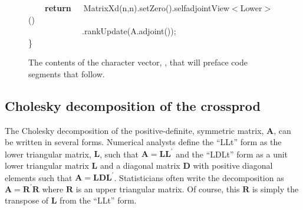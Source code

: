 \documentclass[shortnames,article]{jss}
\newcommand{\hlstd}[1]{\textcolor[rgb]{0,0,0}{#1}}
\newcommand{\hlopt}[1]{\textcolor[rgb]{0,0,0}{#1}}
\newcommand{\hlkwa}[1]{\textcolor[rgb]{0.61,0.13,0.93}{\bf{#1}}}
\newcommand{\hlkwd}[1]{\textcolor[rgb]{0,0,0}{#1}}
\begin{document}
\begin{figure}[htb]
  \hlstd{}\hlstd{\ \ \ \ }\hlstd{}\hlkwa{return}\hlstd{\ \ \ }\hlkwa{}\hlstd{}\hlkwd{MatrixXd}\hlstd{}\hlopt{(}\hlstd{n}\hlopt{,}\hlstd{n}\hlopt{).}\hlstd{}\hlkwd{setZero}\hlstd{}\hlopt{().}\hlstd{selfadjointView}\hlopt{$<$}\hlstd{Lower}\hlopt{$>$()}\hspace*{\fill}\\
  \hlstd{}\hlstd{\ \ \ \ \ \ \ \ \ \ \ \ \ }\hlstd{}\hlopt{.}\hlstd{}\hlkwd{rankUpdate}\hlstd{}\hlopt{(}\hlstd{A}\hlopt{.}\hlstd{}\hlkwd{adjoint}\hlstd{}\hlopt{());}\hspace*{\fill}\\
  \hlstd{}\hlopt{\}}\hlstd{}\hspace*{\fill}\\
  \mbox{}
  \normalfont
  \normalsize
  \caption{The contents of the character vector, , that will preface  code segments that follow.}
  \label{fig:incl}
\end{figure}

\subsection{Cholesky decomposition of the crossprod}
\label{sec:chol}

The Cholesky decomposition of the positive-definite, symmetric matrix,
$\bm A$, can be written in several forms.  Numerical analysts define
the ``LLt'' form as the lower triangular matrix, $\bm L$, such that
$\bm A=\bm L\bm L^\prime$ and the ``LDLt'' form as a unit lower
triangular matrix $\bm L$ and a diagonal matrix $\bm D$ with positive
diagonal elements such that $\bm A=\bm L\bm D\bm L^\prime$.
Statisticians often write the decomposition as $\bm A=\bm R^\prime\bm
R$ where $\bm R$ is an upper triangular matrix.  Of course, this $\bm
R$ is simply the transpose of $\bm L$ from the ``LLt'' form.
\end{document}
